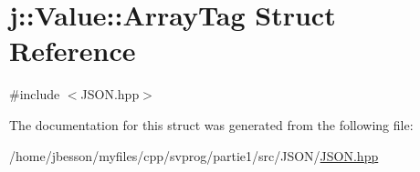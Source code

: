 \hypertarget{structj_1_1_value_1_1_array_tag}{\section{j\-:\-:Value\-:\-:Array\-Tag Struct Reference}
\label{structj_1_1_value_1_1_array_tag}
}


{\ttfamily \#include $<$J\-S\-O\-N.\-hpp$>$}



The documentation for this struct was generated from the following file\-:\begin{DoxyCompactItemize}
\item 
/home/jbesson/myfiles/cpp/svprog/partie1/src/\-J\-S\-O\-N/\hyperlink{_j_s_o_n_8hpp}{J\-S\-O\-N.\-hpp}\end{DoxyCompactItemize}
